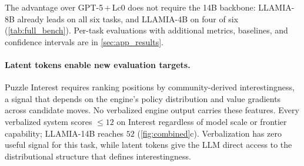The advantage over GPT-5\,+\,Lc0 does not require the 14B backbone: LLAMIA-8B already leads on all six tasks, and LLAMIA-4B on four of six (\cref{tab:full_bench}).
Per-task evaluations with additional metrics, baselines, and confidence intervals are in \cref{sec:app_results}.

\paragraph{Latent tokens enable new evaluation targets.}
Puzzle Interest requires ranking positions by community-derived interestingness, a signal that depends on the engine's policy distribution and value gradients across candidate moves.
No verbalized engine output carries these features.
Every verbalized system scores ${\leq}12$ on Interest regardless of model scale or frontier capability; LLAMIA-14B reaches $52$ (\cref{fig:combined}c).
Verbalization has zero useful signal for this task, while latent tokens give the LLM direct access to the distributional structure that defines interestingness.


